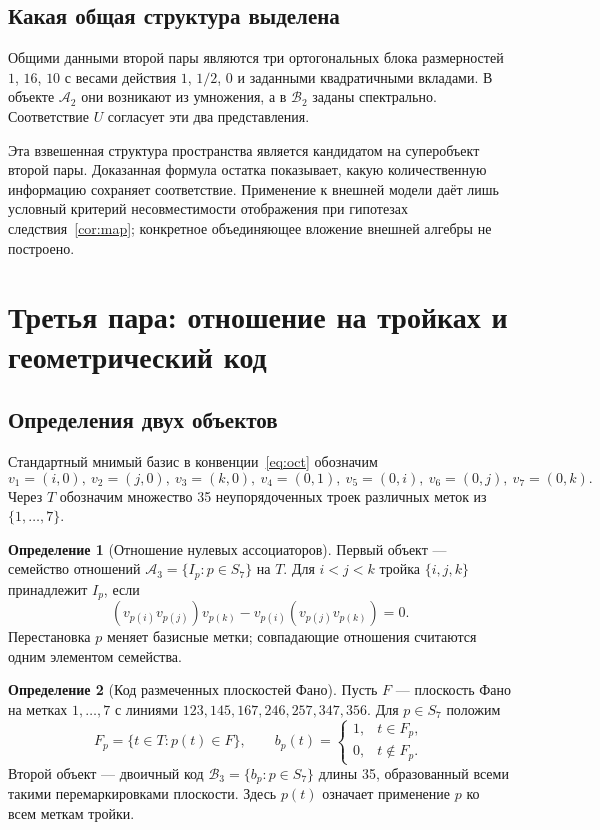 \documentclass[11pt,a4paper]{article}
\numberwithin{equation}{section}
\theoremstyle{definition}
\newtheorem{definition}{Определение}
\theoremstyle{remark}
\begin{document}
\subsection{Какая общая структура выделена}
Общими данными второй пары являются три ортогональных блока
размерностей $1$, $16$, $10$ с весами действия $1$, $1/2$, $0$
и заданными квадратичными вкладами. В объекте $\mathcal A_2$ они
возникают из умножения, а в $\mathcal B_2$ заданы спектрально.
Соответствие $U$ согласует эти два представления.

Эта взвешенная структура пространства является кандидатом на
суперобъект второй пары. Доказанная формула остатка показывает,
какую количественную информацию сохраняет соответствие.
Применение к внешней модели даёт лишь условный критерий
несовместимости отображения при гипотезах следствия~\ref{cor:map};
конкретное объединяющее вложение внешней алгебры не построено.

\section{Третья пара: отношение на тройках и геометрический код}\label{sec:code}
\subsection{Определения двух объектов}
Стандартный мнимый базис в конвенции~\eqref{eq:oct} обозначим
\[
 v_1=(i,0),\ v_2=(j,0),\ v_3=(k,0),\ v_4=(0,1),
 \ v_5=(0,i),\ v_6=(0,j),\ v_7=(0,k).
\]
Через $T$ обозначим множество 35 неупорядоченных троек различных
меток из $\{1,\ldots,7\}$.

\begin{definition}[Отношение нулевых ассоциаторов]\label{def:incidence}
Первый объект --- семейство отношений $\mathcal A_3=\{I_p:p\in S_7\}$
на $T$. Для $i<j<k$ тройка $\{i,j,k\}$ принадлежит $I_p$, если
\[
 (v_{p(i)}v_{p(j)})v_{p(k)}-v_{p(i)}(v_{p(j)}v_{p(k)})=0.
\]
Перестановка $p$ меняет базисные метки; совпадающие отношения
считаются одним элементом семейства.
\end{definition}

\begin{definition}[Код размеченных плоскостей Фано]\label{def:fano-code}
Пусть $F$ --- плоскость Фано на метках $1,\ldots,7$ с линиями
$123,145,167,246,257,347,356$. Для $p\in S_7$ положим
\[
 F_p=\{t\in T:p(t)\in F\},\qquad
 b_p(t)=\begin{cases}1,&t\in F_p,\\0,&t\notin F_p.\end{cases}
\]
Второй объект --- двоичный код $\mathcal B_3=\{b_p:p\in S_7\}$
длины 35, образованный всеми такими перемаркировками плоскости.
Здесь $p(t)$ означает применение $p$ ко всем меткам тройки.
\end{definition}
\end{document}
